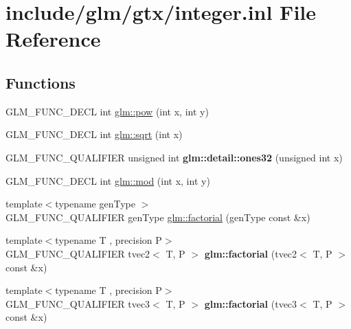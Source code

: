 \hypertarget{gtx_2integer_8inl}{}\section{include/glm/gtx/integer.inl File Reference}
\label{gtx_2integer_8inl}
\subsection*{Functions}
\begin{DoxyCompactItemize}
\item 
G\+L\+M\+\_\+\+F\+U\+N\+C\+\_\+\+D\+E\+CL int \hyperlink{group__gtx__integer_ga9642514a44a67afa70966d756f040ca9}{glm\+::pow} (int x, int y)
\item 
G\+L\+M\+\_\+\+F\+U\+N\+C\+\_\+\+D\+E\+CL int \hyperlink{group__gtx__integer_ga78e2e68330e91d350fcfc2f4831cad12}{glm\+::sqrt} (int x)
\item 
\mbox{\label{gtx_2integer_8inl_a2699e3b3ea6ad8d4bb99aed56761582c}} 
G\+L\+M\+\_\+\+F\+U\+N\+C\+\_\+\+Q\+U\+A\+L\+I\+F\+I\+ER unsigned int {\bfseries glm\+::detail\+::ones32} (unsigned int x)
\item 
G\+L\+M\+\_\+\+F\+U\+N\+C\+\_\+\+D\+E\+CL int \hyperlink{group__gtx__integer_gab9d22df91aac4d9eb925a4910f556f1b}{glm\+::mod} (int x, int y)
\item 
{\footnotesize template$<$typename gen\+Type $>$ }\\G\+L\+M\+\_\+\+F\+U\+N\+C\+\_\+\+Q\+U\+A\+L\+I\+F\+I\+ER gen\+Type \hyperlink{group__gtx__integer_ga8cbd3120905f398ec321b5d1836e08fb}{glm\+::factorial} (gen\+Type const \&x)
\item 
\mbox{\label{gtx_2integer_8inl_a2413666012b76baf1d3f0c44002f1154}} 
{\footnotesize template$<$typename T , precision P$>$ }\\G\+L\+M\+\_\+\+F\+U\+N\+C\+\_\+\+Q\+U\+A\+L\+I\+F\+I\+ER tvec2$<$ T, P $>$ {\bfseries glm\+::factorial} (tvec2$<$ T, P $>$ const \&x)
\item 
\mbox{\label{gtx_2integer_8inl_ab41ee15497a5efb175292e635daa4918}} 
{\footnotesize template$<$typename T , precision P$>$ }\\G\+L\+M\+\_\+\+F\+U\+N\+C\+\_\+\+Q\+U\+A\+L\+I\+F\+I\+ER tvec3$<$ T, P $>$ {\bfseries glm\+::factorial} (tvec3$<$ T, P $>$ const \&x)
\item 

\end{DoxyCompactItemize}
